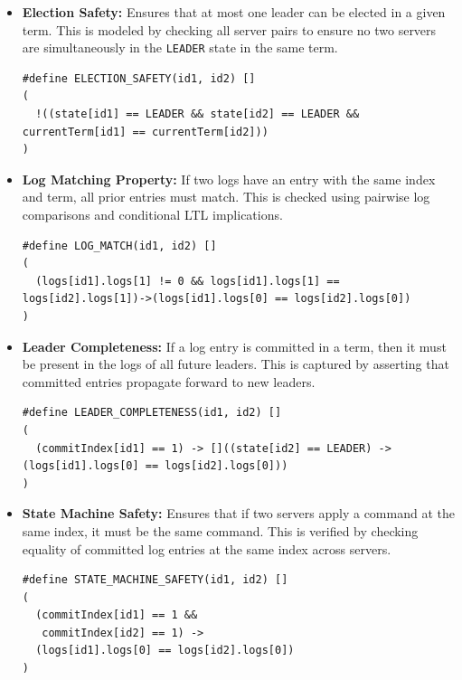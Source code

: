 \documentclass[a4paper]{llncs}
\begin{document}
\begin{itemize}
    \item \textbf{Election Safety:} \label{prop:election_safety} Ensures that at most one leader can be elected in a given term. This is modeled by checking all server pairs to ensure no two servers are simultaneously in the \texttt{LEADER} state in the same term.
    
    \begin{lstlisting}[style=promela, caption={LTL Formula for Election Safety}, label={lst:ltl_election_safety}]
#define ELECTION_SAFETY(id1, id2) []
(
  !((state[id1] == LEADER && state[id2] == LEADER && currentTerm[id1] == currentTerm[id2]))
)
    \end{lstlisting}
    
    \item \textbf{Log Matching Property:} \label{prop:log_matching} If two logs have an entry with the same index and term, all prior entries must match. This is checked using pairwise log comparisons and conditional LTL implications.
    
    \begin{lstlisting}[style=promela, caption={LTL Formula for Log Matching}, label={lst:ltl_log_matching}]
#define LOG_MATCH(id1, id2) [] 
(
  (logs[id1].logs[1] != 0 && logs[id1].logs[1] == logs[id2].logs[1])->(logs[id1].logs[0] == logs[id2].logs[0])
)
    \end{lstlisting}
    
    \item \textbf{Leader Completeness:} \label{prop:leader_completeness} If a log entry is committed in a term, then it must be present in the logs of all future leaders. This is captured by asserting that committed entries propagate forward to new leaders.
    
    \begin{lstlisting}[style=promela, caption={LTL Formula for Leader Completeness}, label={lst:ltl_leader_completeness}]
#define LEADER_COMPLETENESS(id1, id2) [] 
( 
  (commitIndex[id1] == 1) -> []((state[id2] == LEADER) -> (logs[id1].logs[0] == logs[id2].logs[0])) 
)
    \end{lstlisting}
    
    \item \textbf{State Machine Safety:} \label{prop:state_machine_safety} Ensures that if two servers apply a command at the same index, it must be the same command. This is verified by checking equality of committed log entries at the same index across servers.
    
    \begin{lstlisting}[style=promela, caption={LTL Formula for State Machine Safety}, label={lst:ltl_state_machine_safety}]
#define STATE_MACHINE_SAFETY(id1, id2) [] 
( 
  (commitIndex[id1] == 1 && 
   commitIndex[id2] == 1) -> 
  (logs[id1].logs[0] == logs[id2].logs[0]) 
)
    \end{lstlisting}
\end{itemize}
\end{document}
